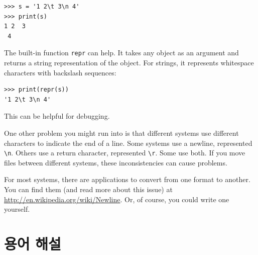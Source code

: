 \documentclass[10pt]{book}
\begin{document}
\begin{verbatim}
>>> s = '1 2\t 3\n 4'
>>> print(s)
1 2	 3
 4
\end{verbatim}

The built-in function {\tt repr} can help.  It takes any object as an
argument and returns a string representation of the object.  For
strings, it represents whitespace
characters with backslash sequences:

\begin{verbatim}
>>> print(repr(s))
'1 2\t 3\n 4'
\end{verbatim}

This can be helpful for debugging.

One other problem you might run into is that different systems
use different characters to indicate the end of a line.  Some
systems use a newline, represented \verb"\n".  Others use
a return character, represented \verb"\r".  Some use both.
If you move files between different systems, these inconsistencies
can cause problems.

For most systems, there are applications to convert from one
format to another.  You can find them (and read more about this
issue) at \url{http://en.wikipedia.org/wiki/Newline}.  Or, of course, you
could write one yourself.


\section{용어 해설}
\end{document}
